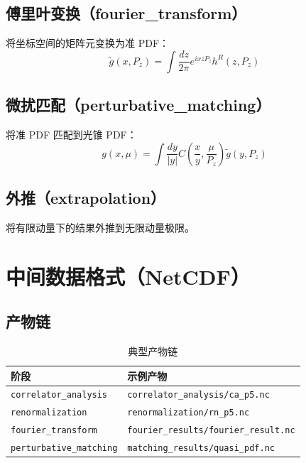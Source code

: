 \documentclass[12pt,a4paper]{ctexart}
\begin{document}
\subsection{傅里叶变换（fourier\_transform）}

将坐标空间的矩阵元变换为准 PDF：
\[
\tilde{g}(x, P_z) = \int \frac{dz}{2\pi} e^{ix z P_z} h^R(z, P_z)
\]

\subsection{微扰匹配（perturbative\_matching）}

将准 PDF 匹配到光锥 PDF：
\[
g(x, \mu) = \int \frac{dy}{|y|} C\left(\frac{x}{y}, \frac{\mu}{P_z}\right) \tilde{g}(y, P_z)
\]

\subsection{外推（extrapolation）}

将有限动量下的结果外推到无限动量极限。

\section{中间数据格式（NetCDF）}

\subsection{产物链}

\begin{table}[h]
\centering
\begin{tabular}{@{}ll@{}}
\toprule
\textbf{阶段} & \textbf{示例产物} \\
\midrule
\texttt{correlator\_analysis} & \texttt{correlator\_analysis/ca\_p5.nc} \\
\texttt{renormalization}     & \texttt{renormalization/rn\_p5.nc} \\
\texttt{fourier\_transform}  & \texttt{fourier\_results/fourier\_result.nc} \\
\texttt{perturbative\_matching} & \texttt{matching\_results/quasi\_pdf.nc} \\
\bottomrule
\end{tabular}
\caption{典型产物链}
\end{table}
\end{document}
